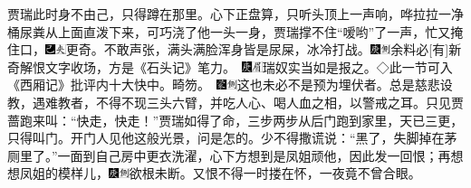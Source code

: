 贾瑞此时身不由己，只得蹲在那里。心下正盘算，只听头顶上一声响，哗拉拉一净桶尿粪从上面直泼下来，可巧浇了他一头一身，贾瑞撑不住``嗳哟''了一声，忙又掩住口，{\includegraphics[width=3mm]{../Images/00003}\includegraphics[width=3mm]{../Images/00012}\footnotesize \kaishu 更奇。}不敢声张，满头满脸浑身皆是尿屎，冰冷打战。{{\includegraphics[width=3mm]{../Images/00004}\includegraphics[width=3mm]{../Images/00011}\footnotesize \kaishu 余料必{[}有{]}新奇解恨文字收场，方是《石头记》笔力。　\includegraphics[width=3mm]{../Images/00004}\includegraphics[width=3mm]{../Images/00010}\footnotesize \kaishu 瑞奴实当如是报之。◇此一节可入《西厢记》批评内十大快中。畸笏。　}\includegraphics[width=3mm]{../Images/00006}\includegraphics[width=3mm]{../Images/00011}\footnotesize \kaishu 这也未必不是预为埋伏者。总是慈悲设教，遇难教者，不得不现三头六臂，并吃人心、喝人血之相，以警戒之耳。}只见贾蔷跑来叫：``快走，快走！''贾瑞如得了命，三步两步从后门跑到家里，天已三更，只得叫门。开门人见他这般光景，问是怎的。少不得撒谎说：``黑了，失脚掉在茅厕里了。''一面到自己房中更衣洗濯，心下方想到是凤姐顽他，因此发一回恨；再想想凤姐的模样儿，{\includegraphics[width=3mm]{../Images/00004}\includegraphics[width=3mm]{../Images/00011}\footnotesize \kaishu 欲根未断。}又恨不得一时搂在怀，一夜竟不曾合眼。

